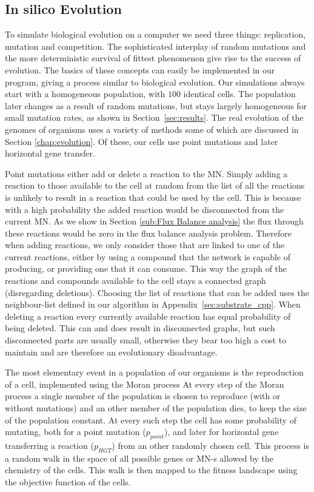 \documentclass[a4paper,12pt]{article}
\begin{document}
\subsection{In silico Evolution}
\label{sub:implementing evolution}
To simulate biological evolution on a computer we need three things: replication, mutation and competition. The sophisticated interplay of random mutations and the more deterministic survival of fittest phenomenon give rise to the success of evolution. The basics of these concepts can easily be implemented in our program, giving a process similar to biological evolution. Our simulations always start with a homogeneous population, with $100$ identical cells. The population later changes as a result of random mutations, but stays largely homogeneous for small mutation rates, as shown in Section~\ref{sec:results}. The real evolution of the genomes of organisms uses a variety of methods some of which are discussed in Section \ref{chap:evolution}. Of these, our cells use point mutations and later horizontal gene transfer.
	
	Point mutations either add or delete a reaction to the MN. Simply adding a reaction to those available to the cell at random from the list of all the reactions is unlikely to result in a reaction that could be used by the cell. This is because with a high probability the added reaction would be disconnected from the current MN. As we show in Section \ref{sub:Flux Balance analysis} the flux through these reactions would be zero in the flux balance analysis problem. Therefore when adding reactions, we only consider those that are linked to one of the current reactions, either by using a compound that the network is capable of producing, or providing one that it can consume. %
	This way the graph of the reactions and compounds available to the cell stays a connected graph (disregarding deletions). Choosing the list of reactions that can be added uses the neighbour-list defined in our algorithm in Appendix~\ref{sec:substrate_cpp}. When deleting a reaction every currently available reaction has equal probability of being deleted. This can and does result in disconnected graphs, but such disconnected parts are usually small, otherwise they bear too high a cost to maintain and are therefore an evolutionary disadvantage.
	
The most elementary event in a population of our organisms is the reproduction of a cell, implemented using the Moran process \cite{moranprocess} 
At every step of the Moran process a single member of the population is chosen to reproduce (with or without mutations) and an other member of the population dies, to keep the size of the population constant. At every such step the cell has some probability of mutating, both for a point mutation ($p_{point}$), and later for horizontal gene transferring a reaction ($p_{HGT}$) from an other randomly chosen cell. This process is a random walk in the space of all possible genes or MN-s allowed by the chemistry of the cells. This walk is then mapped to the fitness landscape using the objective function of the cells.
\end{document}
